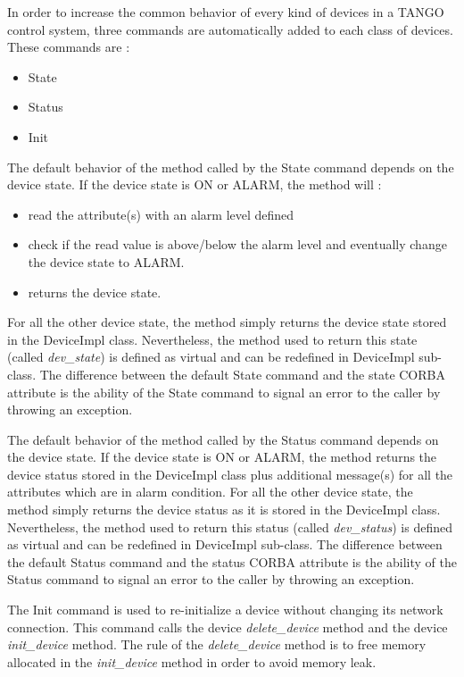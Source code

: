 In order to increase the common behavior of every kind of devices
in a TANGO control system, three commands are automatically added
to each class of devices. These commands are :
\begin{itemize}
\item State
\item Status
\item Init
\end{itemize}
The default behavior of the method called by the State command depends
on the device state. If the device state is ON or ALARM,
the method will :
\begin{itemize}
\item read the attribute(s) with an alarm level defined
\item check if the read value is above/below the alarm level and eventually
change the device state to ALARM.
\item returns the device state.
\end{itemize}
For all the other device state, the method simply returns
the device state stored in the DeviceImpl class. Nevertheless, the
method used to return this state (called \emph{dev\_state})
is defined as virtual and can be redefined in DeviceImpl sub-class.
The difference between the default State command and the state CORBA
attribute is the ability of the State command to signal
an error to the caller by throwing an exception.

The default behavior of the method called by the Status
command depends on the device state. If the device state is ON or
ALARM, the method returns the device status stored in
the DeviceImpl class plus additional message(s) for all the attributes
which are in alarm condition. For all the other device state, the
method simply returns the device status as it is stored in the DeviceImpl
class. Nevertheless, the method used to return this status (called
\emph{dev\_status}) is defined as virtual and can be
redefined in DeviceImpl sub-class. The difference between the default
Status command and the status CORBA attribute is the ability of the
Status command to signal an error to the caller by throwing an exception.

The Init command is used to re-initialize a device without
changing its network connection. This command calls the device \emph{delete\_device}
method and the device \emph{init\_device} method.
The rule of the \emph{delete\_device} method is to free memory allocated
in the \emph{init\_device} method in order to avoid memory leak.

